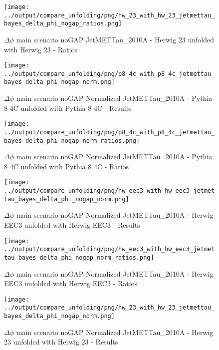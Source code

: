 \documentclass[11pt]{book}
\begin{document}
\begin{figure}[ht]
\centering
\texttt{[image: ../output/compare\_unfolding/png/hw\_23\_with\_hw\_23\_jetmettau\_bayes\_delta\_phi\_nogap\_ratios.png]}
\caption{$\Delta\phi$ main scenario noGAP JetMETTau\_2010A - Herwig 23 unfolded with Herwig 23 - Ratios}
\label{hw_23_hw_23_jetmettau_bayes_delta_phi_nogap_b}
\end{figure}

\begin{figure}[ht]
\centering
\texttt{[image: ../output/compare\_unfolding/png/p8\_4c\_with\_p8\_4c\_jetmettau\_bayes\_delta\_phi\_nogap\_norm.png]}
\caption{$\Delta\phi$ main scenario noGAP Normalized JetMETTau\_2010A - Pythia 8 4C unfolded with Pythia 8 4C - Results}
\label{p8_p8_jetmettau_bayes_delta_phi_nogap_norm_a}
\end{figure}

\begin{figure}[ht]
\centering
\texttt{[image: ../output/compare\_unfolding/png/p8\_4c\_with\_p8\_4c\_jetmettau\_bayes\_delta\_phi\_nogap\_norm\_ratios.png]}
\caption{$\Delta\phi$ main scenario noGAP Normalized JetMETTau\_2010A - Pythia 8 4C unfolded with Pythia 8 4C - Ratios}
\label{p8_p8_jetmettau_bayes_delta_phi_nogap_norm_b}
\end{figure}

\begin{figure}[ht]
\centering
\texttt{[image: ../output/compare\_unfolding/png/hw\_eec3\_with\_hw\_eec3\_jetmettau\_bayes\_delta\_phi\_nogap\_norm.png]}
\caption{$\Delta\phi$ main scenario noGAP Normalized JetMETTau\_2010A - Herwig EEC3 unfolded with Herwig EEC3 - Results}
\label{hw_eec3_hw_eec3_jetmettau_bayes_delta_phi_nogap_norm_a}
\end{figure}

\begin{figure}[ht]
\centering
\texttt{[image: ../output/compare\_unfolding/png/hw\_eec3\_with\_hw\_eec3\_jetmettau\_bayes\_delta\_phi\_nogap\_norm\_ratios.png]}
\caption{$\Delta\phi$ main scenario noGAP Normalized JetMETTau\_2010A - Herwig EEC3 unfolded with Herwig EEC3 - Ratios}
\label{hw_eec3_hw_eec3_jetmettau_bayes_delta_phi_nogap_norm_b}
\end{figure}

\begin{figure}[ht]
\centering
\texttt{[image: ../output/compare\_unfolding/png/hw\_23\_with\_hw\_23\_jetmettau\_bayes\_delta\_phi\_nogap\_norm.png]}
\caption{$\Delta\phi$ main scenario noGAP Normalized JetMETTau\_2010A - Herwig 23 unfolded with Herwig 23 - Results}
\label{hw_23_hw_23_jetmettau_bayes_delta_phi_nogap_norm_a}
\end{figure}
\end{document}
